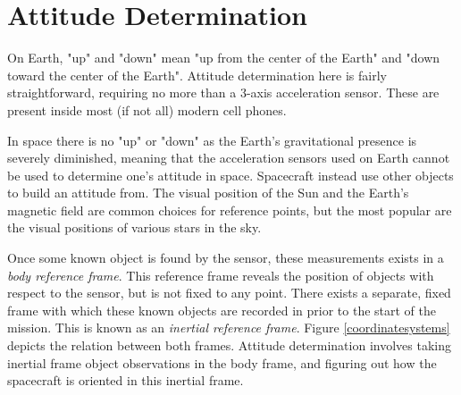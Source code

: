 \section{Attitude Determination}
On Earth, "up" and "down" mean "up from the center of the Earth" and "down toward the center of the Earth". Attitude determination here is fairly straightforward, requiring no more than a 3-axis acceleration sensor. These are present inside most (if not all) modern cell phones. 

In space there is no "up" or "down" as the Earth's gravitational presence is severely diminished, meaning that the acceleration sensors used on Earth cannot be used to determine one's attitude in space. Spacecraft instead use other objects to build an attitude from. The visual position of the Sun and the Earth's magnetic field are common choices for reference points, but the most popular are the visual positions of various stars in the sky. 

Once some known object is found by the sensor, these measurements exists in a \textit{body reference frame}. This reference frame reveals the position of objects with respect to the sensor, but is not fixed to any point. There exists a separate, fixed frame with which these known objects are recorded in prior to the start of the mission. This is known as an \textit{inertial reference frame}. Figure \eqref{coordinatesystems} depicts the relation between both frames. Attitude determination involves taking inertial frame object observations in the body frame, and figuring out how the spacecraft is oriented in this inertial frame. 

\begin{figure}
\label{coordinatesystems}
\end{figure}

